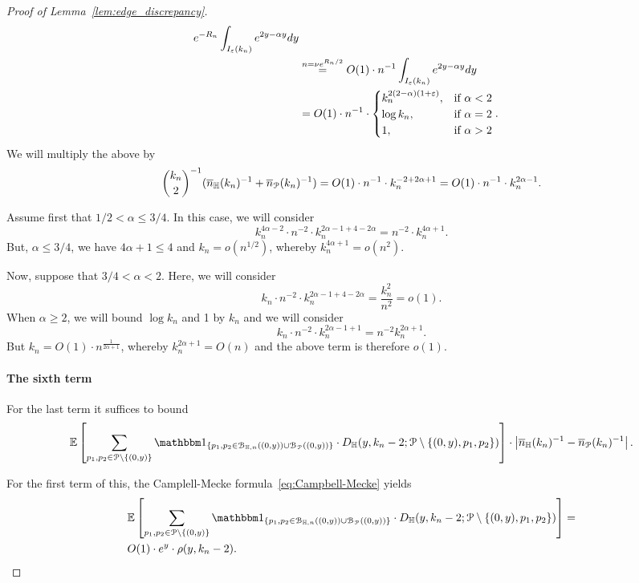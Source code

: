 \begin{proof}[Proof of Lemma~\ref{lem:edge_discrepancy}]
\begin{equation*}
\begin{split}
e^{-R_n} \int_{I_\varepsilon (k_n)} e^{2y -\alpha y} dy \\
&\stackrel{n =\nu e^{R_n/2}}{=} O(1) \cdot n^{-1} \int_{I_\varepsilon (k_n)} e^{2y -\alpha y} dy \\
&= O(1) \cdot n^{-1} \cdot 
\begin{cases}
k_n^{2(2-\alpha) (1+\varepsilon)}, & \mbox{if $\alpha < 2$} \\
\log k_n, & \mbox{if $\alpha =2$} \\
1, & \mbox{if $\alpha >2$}
\end{cases}.
\end{split}
\end{equation*}
We will multiply the above by $${k_n \choose 2}^{-1} (\overline{n}_{\mathbb{H}}(k_n)^{-1} + \overline{n}_{{\mathcal P}}(k_n)^{-1}) = 
O(1) \cdot n^{-1} \cdot k_n^{-2 +2\alpha +1} = O(1) \cdot n^{-1} \cdot k_n^{2\alpha -1}.$$

Assume first that $1/2 <\alpha \leq 3/4$. In this case, we will consider
$$ k_n^{4\alpha -2} \cdot n^{-2} \cdot k_n^{2\alpha -1 + 4 - 2\alpha} = 
n^{-2} \cdot k_n^{4\alpha +1}.$$
But, $\alpha \leq 3/4$, we have $4\alpha +1 \leq 4$ and $k_n = o(n^{1/2})$, whereby $k_n^{4\alpha +1} = o(n^{2})$. 

Now, suppose that $3/4 < \alpha < 2$. Here, we will consider 
$$ k_n \cdot n^{-2} \cdot k_n^{2\alpha -1 + 4 - 2\alpha} =\frac{k_n^2}{n^2} = o(1).$$ 
When $\alpha \geq 2$, we will bound $\log k_n$ and 1 by $k_n$ and we will consider 
$$ k_n \cdot n^{-2} \cdot k_n^{2\alpha -1 +1}= n^{-2} k_n^{2\alpha +1}.$$ 
But $k_n = O(1)\cdot n^{\frac{1}{2\alpha +1}}$, whereby $k_n^{2\alpha +1} =O(n)$ and 
the above term is therefore $o(1)$.

\paragraph{The sixth term} 

For the last term it suffices to bound 
\begin{equation*}
 \Exp {\sum_{p_1,p_2 \in \Pcal \setminus \{(0,y)\}} \ind{p_1,p_2 \in \BallHyp{(0,y)}\cup \BallPo{(0,y)}} \cdot 
D_{\H}(y,k_n-2; \Pcal \setminus \{ (0,y),p_1,p_2\})}
\cdot 
\left| \expH^{-1} - \expP^{-1} \right|.
\end{equation*}

For the first term of this,
the Camplell-Mecke formula~\eqref{eq:Campbell-Mecke} yields 
\begin{equation*} 
\begin{split} 
&\Exp {\sum_{p_1,p_2 \in \Pcal \setminus \{(0,y)\}} \ind{p_1,p_2 \in \BallHyp{(0,y)}\cup \BallPo{(0,y)}} \cdot 
D_{\H}(y,k_n-2; \Pcal \setminus \{ (0,y),p_1,p_2\})} =\\
& O(1) \cdot e^{y} \cdot \rho(y,k_n-2).
\end{split}
\end{equation*}


\end{proof}
